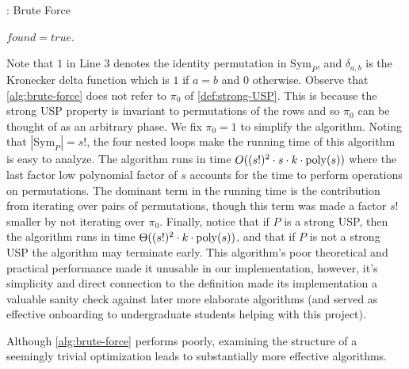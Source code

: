 \documentclass[11pt]{article}
\newcommand\Sym[1]{\ensuremath{\mathrm{Sym}_{#1}}}
\begin{document}
\begin{algorithm}
  \caption{: Brute Force}
  \label{alg:brute-force}
\begin{algorithmic}[1]
  \For{$\pi_1 \in \Sym{P}$}
    \For{$\pi_2 \in \Sym{P}$}
             $found = true$. \EndIf
          \EndFor
        \EndFor
          \EndIf  
      \EndIf
    \EndFor
  \EndFor
  \EndFunction
\end{algorithmic}
\end{algorithm}
Note that $1$ in Line 3 denotes the identity permutation in $\Sym{P}$,
and $\delta_{a,b}$ is the Kronecker delta function which is $1$ if $a
= b$ and $0$ otherwise.  Observe that \autoref{alg:brute-force} does
not refer to $\pi_0$ of \autoref{def:strong-USP}.  This is because the
strong USP property is invariant to permutations of the rows and so
$\pi_0$ can be thought of as an arbitrary phase.  We fix $\pi_0 = 1$
to simplify the algorithm.  Noting that $|\Sym{P}| = s!$, the four
nested loops make the running time of this algorithm is easy to
analyze.  The algorithm runs in time $O((s!)^2 \cdot s \cdot k \cdot
\operatorname{poly}(s))$ where the last factor low polynomial factor of $s$ accounts
for the time to perform operations on permutations.  The dominant term
in the running time is the contribution from iterating over pairs of
permutations, though this term was made a factor $s!$ smaller by not
iterating over $\pi_0$.  Finally, notice that if $P$ is a strong USP,
then the algorithm runs in time $\Theta((s!)^2 \cdot k \cdot
\operatorname{poly}(s))$, and that if $P$ is not a strong USP the algorithm may
terminate early.  This algorithm's poor theoretical and practical
performance made it unusable in our implementation, however, it's
simplicity and direct connection to the definition made its
implementation a valuable sanity check against later more elaborate
algorithms (and served as effective onboarding to undergraduate
students helping with this project).

Although \autoref{alg:brute-force} performs poorly, examining the
structure of a seemingly trivial optimization leads to substantially
more effective algorithms.
\end{document}
